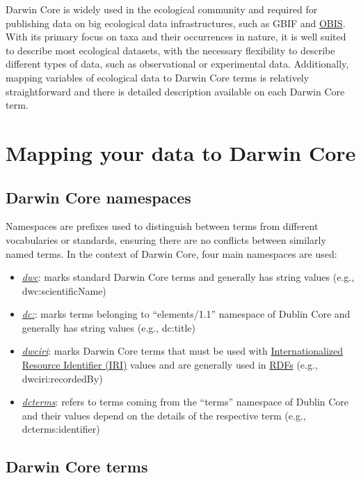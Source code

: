 \documentclass[
  oneside]{book}
\begin{document}
Darwin Core is widely used in the ecological community and required for publishing data on big ecological data infrastructures, such as GBIF and \hyperref[OBIS]{OBIS}. With its primary focus on taxa and their occurrences in nature, it is well suited to describe most ecological datasets, with the necessary flexibility to describe different types of data, such as observational or experimental data. Additionally, mapping variables of ecological data to Darwin Core terms is relatively straightforward and there is detailed description available on each Darwin Core term.

\section{Mapping your data to Darwin Core}\label{mapping-your-data-to-darwin-core}

\subsection{Darwin Core namespaces}\label{darwin-core-namespaces}

Namespaces are prefixes used to distinguish between terms from different vocabularies or standards, ensuring there are no conflicts between similarly named terms. In the context of Darwin Core, four main namespaces are used:

\begin{itemize}
\item
  \href{http://rs.tdwg.org/dwc/terms/}{\emph{dwc}}: marks standard Darwin Core terms and generally has string values (e.g., dwc:scientificName)
\item
  \href{http://purl.org/dc/elements/1.1/}{\emph{dc:}}: marks terms belonging to ``elements/1.1'' namespace of Dublin Core and generally has string values (e.g., dc:title)
\item
  \href{http://rs.tdwg.org/dwc/iri/}{\emph{dwciri}}: marks Darwin Core terms that must be used with \hyperref[URI]{Internationalized Resource Identifier (IRI)} values and are generally used in \hyperref[RDF]{RDFs} (e.g., dwciri:recordedBy)
\item
  \href{http://purl.org/dc/terms/}{\emph{dcterms}}: refers to terms coming from the ``terms'' namespace of Dublin Core and their values depend on the details of the respective term (e.g., dcterms:identifier)
\end{itemize}

\subsection{Darwin Core terms}\label{darwin-core-terms}
\end{document}

